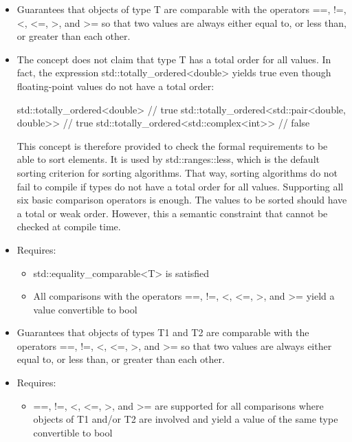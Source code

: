 \begin{itemize}
\item
Guarantees that objects of type T are comparable with the operators ==, !=, <, <=, >, and >= so that two values are always either equal to, or less than, or greater than each other.

\item
The concept does not claim that type T has a total order for all values. In fact, the expression std::totally\_ordered<double> yields true even though floating-point values do not have a total order:

\begin{cpp}
std::totally_ordered<double> // true
std::totally_ordered<std::pair<double, double>> // true
std::totally_ordered<std::complex<int>> // false
\end{cpp}

This concept is therefore provided to check the formal requirements to be able to sort elements. It is used by std::ranges::less, which is the default sorting criterion for sorting algorithms. That way, sorting algorithms do not fail to compile if types do not have a total order for all values. Supporting all six basic comparison operators is enough. The values to be sorted should have a total or weak order. However, this a semantic constraint that cannot be checked at compile time.

\item
Requires:
\begin{itemize}
\item
std::equality\_comparable<T> is satisfied

\item
All comparisons with the operators ==, !=, <, <=, >, and >= yield a value convertible to bool
\end{itemize}
\end{itemize}


\begin{itemize}
\item
Guarantees that objects of types T1 and T2 are comparable with the operators ==, !=, <, <=, >, and >= so that two values are always either equal to, or less than, or greater than each other.

\item
Requires:
\begin{itemize}
\item
==, !=, <, <=, >, and >= are supported for all comparisons where objects of T1 and/or T2 are involved and yield a value of the same type convertible to bool
\end{itemize}
\end{itemize}


